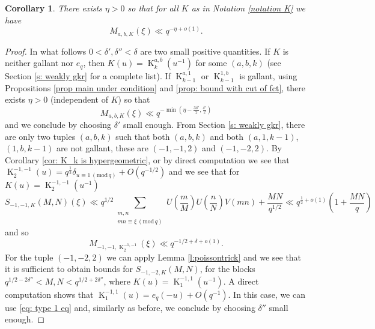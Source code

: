 \documentclass[12pt]{amsart}
\theoremstyle{plain}
\newtheorem{cor}[thm]{Corollary}
\theoremstyle{definition}
\theoremstyle{remark}
\numberwithin{equation}{section}
\newcommand{\mods}[1]{\,(\mathrm{mod}\,{#1})}
\DeclareMathOperator{\K}{K} %
\begin{document}
\begin{cor}\label{cor: conclusion chap 4}There exists $\eta >0$ so that for all $K$ as in Notation \ref{notation K} we have 
\[M_{a,b,K}(\xi) \ll q^{-\eta + o(1)}.\]
\end{cor}
\begin{proof} In what follows $0<\delta',\delta''<\delta$ are two small positive quantities. 
    If $K$ is neither gallant nor $e_q$, then $K(u) = \K_k^{a,b}(u^{-1})$ for some $(a,b,k)$ (see Section \ref{s: weakly gkr} for a complete list). If $\K_{k-1}^{a,1}$ or $\K_{k-1}^{1,b}$ is gallant, using Propositions \ref{prop main under condition} and \ref{prop: bound with cut of fct}, there exists $\eta >0$ (independent of $K$) so that  
    \[M_{a,b,K}(\xi) \ll q^{-\min(\eta-\frac{3\delta'}{2},\frac{\delta'}{2})} \]
    and we conclude by choosing $\delta'$ small enough.
    From Section \ref{s: weakly gkr}, there are only two tuples $(a,b,k)$ such that both $(a,b,k)$ and  both $(a,1,k-1)$, $(1,b,k-1)$ are not gallant, these are $(-1,-1,2)$ and $(-1,-2,2)$. 
    By Corollary \ref{cor: K_k is hypergeometric}, or by direct computation we see that $\K_2^{-1,-1}(u) = q^{\frac{1}{2}}\delta_{u\equiv 1\mods{q}}+O(q^{-1/2})$ and we see that for $K(u)=\K_2^{-1,-1}(u^{-1})$ 
    \[S_{-1,-1,K}(M,N)(\xi) \ll q^{1/2}\sum_{\substack{m,n\\ mn\equiv \xi\mods{q}}}U\left(\frac{m}{M}\right)U\left(\frac{n}{N}\right)V(mn) + \frac{MN}{q^{1/2}} \ll q^{\frac{1}{2}+o(1)}(1+\frac{MN}{q})\]
    and so 
    \[M_{-1,-1,\K_2^{-1,-1}}(\xi) \ll q^{-1/2+\delta+o(1)}.\]
    For the tuple $(-1,-2,2)$ we can apply Lemma \ref{l:poissontrick} and we see that it is sufficient to obtain bounds for $S_{-1,-2,K}(M,N)$, for the blocks $q^{1/2-2\delta''}<M,N<q^{1/2+2\delta''}$, where $K(u) = \K_1^{-1,1}(u^{-1})$. A direct computation shows that $\K_1^{-1,1}(u) = e_q(-u)+ O(q^{-1})$. In this case, we can use \eqref{eq: type 1 eq} and, similarly as before, we conclude by choosing $\delta''$ small enough. 
    
    
    
\end{proof}
    
\end{document}
